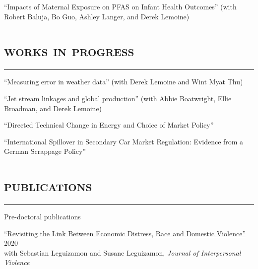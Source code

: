 \documentclass[letterpaper]{article}
\renewenvironment{itemize}{
  \begin{list}{}{
    \setlength{\leftmargin}{1em}
      \setlength{\itemsep}{0.25em}
    \setlength{\parskip}{0pt}
    \setlength{\parsep}{0pt} 
  }
}{
  \end{list}
}
\begin{document}
\begin{itemize}
``Impacts of Maternal Exposure on PFAS on Infant Health Outcomes'' (with Robert Baluja, Bo Guo, Ashley Langer, and Derek Lemoine)


\end{itemize}

\section*{\textsc{\textbf{works in progress}}}
\hrule 
\vspace{.2cm}
\begin{itemize}
\item ``Measuring error in weather data'' (with Derek Lemoine and Wint Myat Thu)
\vspace{0.3cm}
\item ``Jet stream linkages and global production'' (with Abbie Boatwright, Ellie Broadman, and Derek Lemoine)
\vspace{0.3cm}
\item ``Directed Technical Change in Energy and Choice of Market Policy''
\vspace{0.3cm}
\item ``International Spillover in Secondary Car Market Regulation: Evidence from a German Scrappage Policy''
\end{itemize}

\section*{\textsc{\textbf{publications}}}
\hrule
\vspace{.2cm}
Pre-doctoral publications
\begin{itemize}
\item \href{https://www.dropbox.com/s/mhxkbqmrir1vqwr/Leguizamon_etal_2020.pdf?dl=0}{``Revisiting the Link Between Economic Distress, Race and Domestic Violence''} \, \hfill 2020  \\ \phantom{\,,}with Sebastian Leguizamon and Susane Leguizamon, \emph{Journal of Interpersonal Violence}
\end{itemize}

%
%
\end{document}
